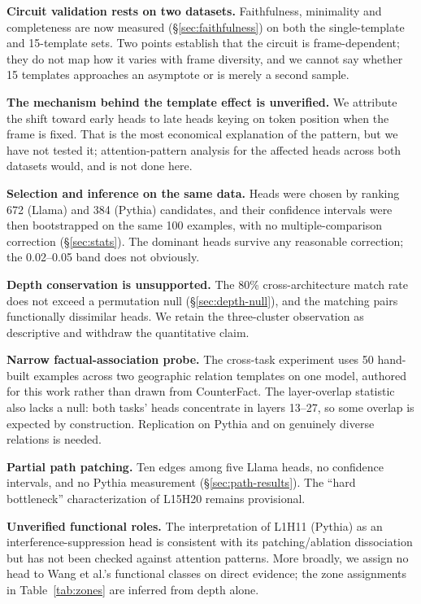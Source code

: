 \documentclass[11pt,a4paper]{article}
\begin{document}
\textbf{Circuit validation rests on two datasets.} Faithfulness, minimality and
completeness are now measured (\S\ref{sec:faithfulness}) on both the single-template and
15-template sets. Two points establish that the circuit is frame-dependent; they do not
map how it varies with frame diversity, and we cannot say whether 15 templates approaches
an asymptote or is merely a second sample.

\textbf{The mechanism behind the template effect is unverified.} We attribute the shift
toward early heads to late heads keying on token position when the frame is fixed. That
is the most economical explanation of the pattern, but we have not tested it;
attention-pattern analysis for the affected heads across both datasets would, and is not
done here.

\textbf{Selection and inference on the same data.} Heads were chosen by ranking 672
(Llama) and 384 (Pythia) candidates, and their confidence intervals were then
bootstrapped on the same 100 examples, with no multiple-comparison correction
(\S\ref{sec:stats}). The dominant heads survive any reasonable correction; the
0.02--0.05 band does not obviously.

\textbf{Depth conservation is unsupported.} The 80\% cross-architecture match rate
does not exceed a permutation null (\S\ref{sec:depth-null}), and the matching pairs
functionally dissimilar heads. We retain the three-cluster observation as descriptive
and withdraw the quantitative claim.

\textbf{Narrow factual-association probe.} The cross-task experiment uses 50
hand-built examples across two geographic relation templates on one model, authored
for this work rather than drawn from CounterFact. The layer-overlap statistic also lacks a
null: both tasks' heads concentrate in layers 13--27, so some overlap is expected by
construction. Replication on Pythia and on genuinely diverse relations is needed.

\textbf{Partial path patching.} Ten edges among five Llama heads, no confidence
intervals, and no Pythia measurement (\S\ref{sec:path-results}). The
``hard bottleneck'' characterization of L15H20 remains provisional.

\textbf{Unverified functional roles.} The interpretation of L1H11 (Pythia) as an
interference-suppression head is consistent with its patching/ablation dissociation
but has not been checked against attention patterns. More broadly, we assign no head
to Wang et al.'s functional classes on direct evidence; the zone assignments in
Table~\ref{tab:zones} are inferred from depth alone.
\end{document}
